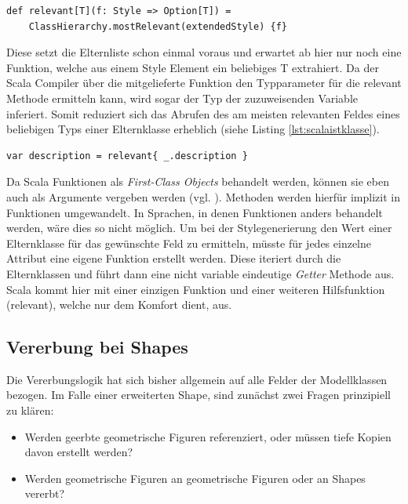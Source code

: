 \begin{lstlisting}[style=scala, caption = {Auszug aus Code Hilfsfunktion relevant}, label = {lst:defrelevant}]
def relevant[T](f: Style => Option[T]) =
    ClassHierarchy.mostRelevant(extendedStyle) {f}
\end{lstlisting}Diese setzt die Elternliste schon einmal voraus und erwartet ab hier nur noch eine Funktion, welche aus einem Style Element ein beliebiges T extrahiert.
Da der Scala Compiler über die mitgelieferte Funktion den Typparameter für die relevant Methode ermitteln kann, wird sogar der Typ der zuzuweisenden Variable inferiert. Somit reduziert sich das Abrufen des am meisten relevanten Feldes eines beliebigen Typs einer Elternklasse erheblich (siehe Listing \ref{lst:scalaistklasse}).
\begin{lstlisting}[style=scala, caption = {Beispielaufruf um die latest-Bound description der Eterninstanzen zu ermitteln}, label = {lst:scalaistklasse}]
var description = relevant{ _.description }
\end{lstlisting}Da Scala Funktionen als \textit{First-Class Objects} behandelt werden, können sie eben auch als Argumente vergeben werden (vgl. ). Methoden werden hierfür implizit in Funktionen umgewandelt. In Sprachen, in denen Funktionen anders behandelt werden, wäre dies so nicht möglich. Um bei der Stylegenerierung den Wert einer Elternklasse für das gewünschte Feld zu ermitteln, müsste für jedes einzelne Attribut eine eigene Funktion erstellt werden. Diese iteriert durch die Elternklassen und führt dann eine nicht variable eindeutige \textit{Getter} Methode aus. Scala kommt hier mit einer einzigen Funktion und einer weiteren Hilfsfunktion (relevant), welche nur dem Komfort dient, aus.

\subsection{Vererbung bei Shapes}\label{shapeinheritance}Die Vererbungslogik hat sich bisher allgemein auf alle Felder der Modellklassen bezogen. Im Falle einer erweiterten Shape, sind zunächst zwei Fragen prinzipiell zu klären:
\begin{itemize}
\item Werden geerbte geometrische Figuren referenziert, oder müssen tiefe Kopien davon erstellt werden?
\item Werden geometrische Figuren an geometrische Figuren oder an Shapes vererbt?
\end{itemize}

